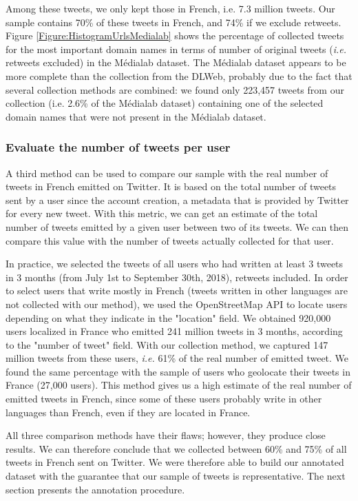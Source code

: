 Among these tweets, we only kept those in French, i.e. 7.3 million tweets. Our sample contains 70\% of these tweets in French, and 74\% if we exclude retweets. Figure \ref{Figure:HistogramUrlsMedialab} shows the percentage of collected tweets for the most important domain names in terms of number of original tweets (\textit{i.e.} retweets excluded) in the Médialab dataset. The Médialab dataset appears to be more complete than the collection from the DLWeb, probably due to the fact that several collection methods are combined: we found only 223,457 tweets from our collection (i.e. 2.6\% of the Médialab dataset) containing one of the selected domain names that were not present in the Médialab dataset.

\subsubsection{Evaluate the number of tweets per user}

A third method can be used to compare our sample with the real number of tweets in French emitted on Twitter. It is based on the total number of tweets sent by a user since the account creation, a metadata that is provided by Twitter for every new tweet. With this metric, we can get an estimate of the total number of tweets emitted by a given user between two of its tweets. We can then compare this value with the number of tweets actually collected for that user.

In practice, we selected the tweets of all users who had written at least 3 tweets in 3 months (from July 1st to September 30th, 2018), retweets included. In order to select users that write mostly in French (tweets written in other languages are not collected with our method), we used the OpenStreetMap API to locate users depending on what they indicate in the "location" field. We obtained 920,000 users localized in France who emitted 241 million tweets in 3 months, according to the "number of tweet" field. With our collection method, we captured 147 million tweets from these users, \textit{i.e.} 61\% of the real number of emitted tweet. We found the same percentage with the sample of users who geolocate their tweets in France (27,000 users). This method gives us a high estimate of the real number of emitted tweets in French, since some of these users probably write in other languages than French, even if they are located in France.

All three comparison methods have their flaws; however, they produce close results.
We can therefore conclude that we collected between 60\% and 75\% of all tweets in French sent on Twitter.
We were therefore able to build our annotated dataset with the guarantee that our sample of tweets is representative.
The next section presents the annotation procedure.


